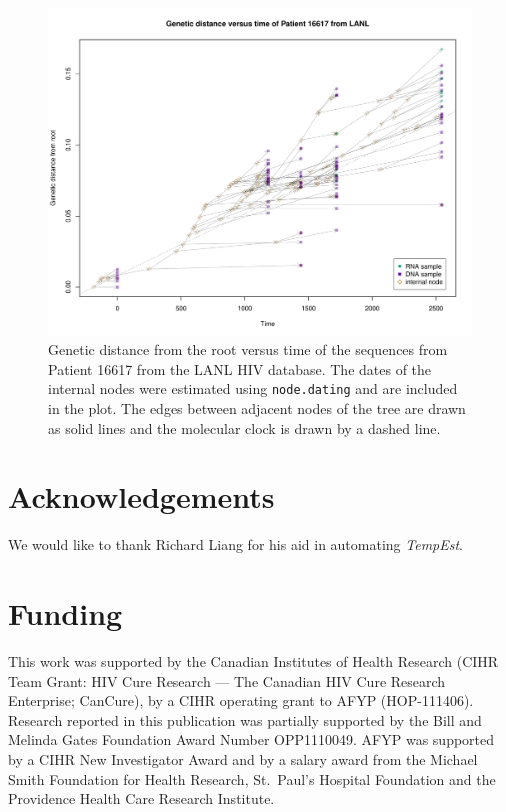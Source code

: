 \documentclass{bioinfo}
\newcommand{\code}[1]{{\tt #1}}
\begin{document}
\begin{figure}[b]
	\vspace{-10pt}
	\centering
	\includegraphics[width=\columnwidth]{patient_16617}
	\caption[Genetic distance versus time plot]{Genetic distance from the root versus time of the sequences from Patient 16617 from the LANL HIV database. The dates of the internal nodes were estimated using \code{node.dating} and are included in the plot. The edges between adjacent nodes of the tree are drawn as solid lines and the molecular clock is drawn by a dashed line.}
	\label{fig:pat16617}
\end{figure}

\vspace*{-18pt}

\section*{Acknowledgements} \label{sec:ackn}
We would like to thank Richard Liang for his aid in automating \emph{TempEst}.

\vspace*{-18pt}

\section*{Funding} \label{sec:fund}
This work was supported by the Canadian Institutes of Health Research (CIHR Team Grant: HIV Cure Research --- The Canadian HIV Cure Research Enterprise; CanCure), by a CIHR operating grant to AFYP (HOP-111406).
Research reported in this publication was partially supported by the Bill and Melinda Gates Foundation Award Number OPP1110049.
AFYP was supported by a CIHR New Investigator Award and by a salary award from the Michael Smith Foundation for Health Research, St.~Paul's Hospital Foundation and the Providence Health Care Research Institute.
\end{document}
